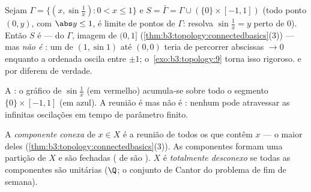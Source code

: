 \begin{example}
\label{ex:b3:topology:sinecurve}
Sejam $\Gamma = \{(x, \sin\frac1x) : 0 < x \leq 1\}$ e $S =
\bar\Gamma = \Gamma \cup (\{0\}\times[-1,1])$ (todo ponto $(0,
y)$, com $\abs y \leq 1$, é limite de
pontos de $\Gamma$: resolva $\sin\frac1x = y$ perto de $0$). Então $S$ é
\emph{} ---  do  $\Gamma$, imagem  de
$(0, 1]$ (\cref{thm:b3:topology:connectedbasics}(3)) --- mas \emph{não é }: um  de $(1, \sin 1)$ até $(0,0)$ teria de percorrer
abscissas $\to 0$ enquanto a ordenada oscila entre $\pm1$; o~\cref{exo:b3:topology:9} torna isso rigoroso.  e  por
 diferem de verdade.
\end{example}

\begin{omfigure}

{\small A : o gráfico de $\sin\frac1x$ (em vermelho)
acumula-se sobre todo o segmento $\{0\}\times[-1,1]$ (em azul). A reunião é 
mas não é : nenhum   pode atravessar
as infinitas oscilações em tempo de parâmetro finito.}
\end{omfigure}

\begin{definition}\label{def:b3:topology:components}
A \emph{componente conexa} de $x
\in X$ é a
reunião de todos os  que contêm $x$ --- o maior deles
(\cref{thm:b3:topology:connectedbasics}(3)). As componentes formam uma partição de $X$ e são
fechadas ( de  são ). $X$ é \emph{totalmente
desconexo} se todas as componentes são unitárias ($\Q$; o conjunto
de Cantor do problema de fim de semana).
\end{definition}

